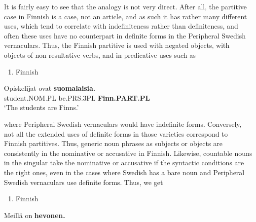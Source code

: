 It is fairly easy to see that the analogy is not very direct. After all, the partitive case in Finnish is a case, not an article, and as such it has rather many different uses, which tend to correlate with indefiniteness rather than definiteness, and often these uses have no counterpart in definite forms in the Peripheral Swedish vernaculars. Thus, the Finnish partitive is used with negated objects, with objects of non-resultative verbs, and in predicative uses such as 

\begin{enumerate} %
\item 
Finnish

\end{enumerate} %
\ea\label{}
\gll Opiskelijat  ovat  \textbf{suomalaisia.}\\


student.NOM.PL  be.PRS.3PL  \textbf{Finn.PART.PL}\\ %


‘The students are Finns.’
\z


where Peripheral Swedish vernaculars would have indefinite forms. Conversely, not all the extended uses of definite forms in those varieties correspond to Finnish partitives. Thus, generic noun phrases as subjects or objects are consistently in the nominative or accusative in Finnish. Likewise, countable nouns in the singular take the nominative or accusative if the syntactic conditions are the right ones, even in the cases where Swedish has a bare noun and Peripheral Swedish vernaculars use definite forms. Thus, we get

\begin{enumerate} %
\item 
Finnish

\end{enumerate} %
\ea\label{}
\gll Meillä  on  \textbf{hevonen.} \\



